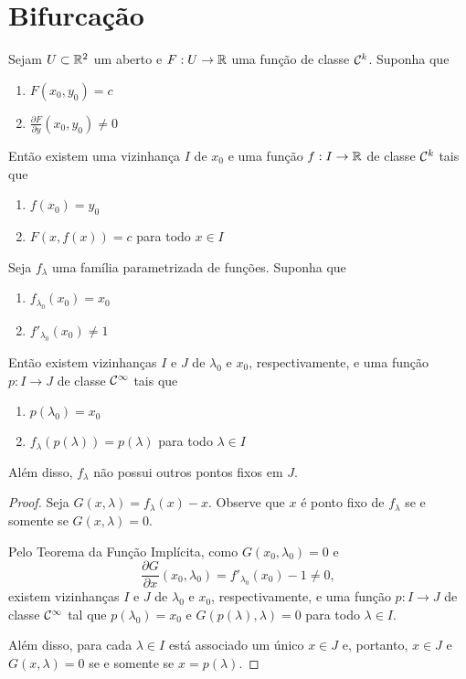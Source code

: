 \section{Bifurcação}

\begin{theorem}
Sejam $U \subset \mathbb{R}^2$ um aberto e $F: U \to \mathbb{R}$ uma função de classe $\mathcal{C}^k$. Suponha que
\begin{enumerate}
\item $F(x_0, y_0) = c$
\item $\frac{\partial F}{\partial y} (x_0, y_0) \neq 0$
\end{enumerate} 
Então existem uma vizinhança $I$ de $x_0$ e uma função $f: I \to \mathbb{R}$ de classe $\mathcal{C}^k$ tais que
\begin{enumerate}
\item $f(x_0) = y_0$
\item $F(x, f(x)) = c$ para todo $x \in I$
\end{enumerate}
\end{theorem}


\begin{theorem}
\label{theorem1}
Seja $f_\lambda$ uma família parametrizada de funções. Suponha que \begin{enumerate}
\item $f_{\lambda_0}(x_0) = x_0$
\item $f'_{\lambda_0}(x_0) \neq 1$ 
\end{enumerate}
Então existem vizinhanças $I$ e $J$ de $\lambda_0$ e $x_0$, respectivamente, e uma função $p: I \to J$ de classe $\mathcal{C}^\infty$ tais que
\begin{enumerate}
\item $p(\lambda_0) = x_0$ 
\item $f_\lambda(p(\lambda)) = p(\lambda)$ para todo $\lambda \in I$
\end{enumerate}
Além disso, $f_\lambda$ não possui outros pontos fixos em $J$.
\end{theorem}

\begin{proof}
Seja $G(x, \lambda) = f_\lambda(x) - x$. Observe que $x$ é ponto fixo de $f_\lambda$ se e somente se $G(x, \lambda) = 0$.

Pelo Teorema da Função Implícita, como $G(x_0, \lambda_0) = 0$ e
$$\frac{\partial G}{\partial x} (x_0, \lambda_0) = f'_{\lambda_0}(x_0) - 1 \neq 0,$$
existem vizinhanças $I$ e $J$ de $\lambda_0$ e $x_0$, respectivamente, e uma função $p: I \to J$ de classe $\mathcal{C}^\infty$ tal que $p(\lambda_0) = x_0$ e $G(p(\lambda), \lambda) = 0$ para todo $\lambda \in I$.

Além disso, para cada $\lambda \in I$ está associado um único $x \in J$ e, portanto, $x \in J$ e $G(x, \lambda) = 0$ se e somente se $x = p(\lambda)$.
\end{proof}

